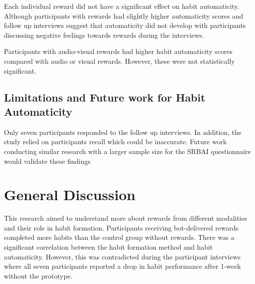 \documentclass{scaffold/sigchi}
\begin{document}
Each individual reward did not have a significant effect on habit automaticity. Although participants with rewards had slightly higher automaticity scores and follow up interviews suggest that automaticity did not develop with participants discussing negative feelings towards rewards during the interviews.  

Participants with audio-visual rewards had higher habit automaticity scores compared with audio or visual rewards. However, these were not statistically significant.

\subsection{Limitations and Future work for Habit Automaticity}
Only seven participants responded to the follow up interviews. In addition, the study relied on participants recall which could be inaccurate. Future work conducting similar research with a larger sample size for the SRBAI questionnaire would validate these findings

\section{General Discussion}
This research aimed to understand more about rewards from different modalities and their role in habit formation. Participants receiving bot-delivered rewards completed more habits than the control group without rewards. There was a significant correlation between the habit formation method and habit automaticity. However, this was contradicted during the participant interviews where all seven participants reported a drop in habit performance after 1-week without the prototype.

\end{document}
